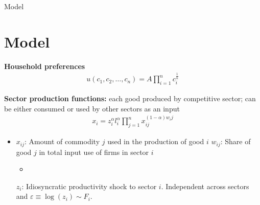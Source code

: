 \documentclass[dvipsnames]{beamer}
\begin{document}
\begin{frame}{Model}
  
\section{Model}

{\bf Household preferences} 
\begin{align}
  u(c_1,c_2,\ldots ,c_n)=A \prod \limits_{i=1}^n c_i^{\frac{1}{n}}
\end{align}

{\bf Sector production functions:} each good produced by competitive sector; can be either consumed or used by other sectors as an input
\begin{align}
  x_i=z_i^\alpha l_i^\alpha \prod \limits_{j=1}^n x_{ij}^{(1-\alpha)w_ij}
\end{align}

\begin{itemize}
  \item $x_{ij}$: Amount of commodity $j$ used in the production of good $i$
  \vitem $w_{ij}$: Share of good $j$ in total input use of firms in sector $i$
    \begin{itemize}
    \item 
    \end{itemize}
  \vitem $z_i$: Idiosyncratic productivity shock to sector $i$. Independent across
  sectors and  $\varepsilon \equiv \log(z_i) \sim F_i$.
\end{itemize}
\end{frame}
%
\end{document}
